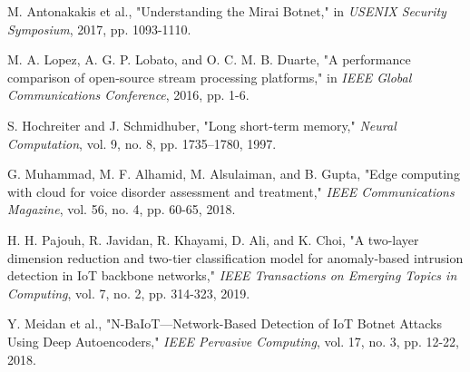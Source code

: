 \documentclass[conference]{IEEEtran}
\begin{document}
\begin{thebibliography}{00}
 M. Antonakakis et al., "Understanding the Mirai Botnet," in \textit{USENIX Security Symposium}, 2017, pp. 1093-1110.

 M. A. Lopez, A. G. P. Lobato, and O. C. M. B. Duarte, "A performance comparison of open-source stream processing platforms," in \textit{IEEE Global Communications Conference}, 2016, pp. 1-6.

 S. Hochreiter and J. Schmidhuber, "Long short-term memory," \textit{Neural Computation}, vol. 9, no. 8, pp. 1735–1780, 1997.

 G. Muhammad, M. F. Alhamid, M. Alsulaiman, and B. Gupta, "Edge computing with cloud for voice disorder assessment and treatment," \textit{IEEE Communications Magazine}, vol. 56, no. 4, pp. 60-65, 2018.

 H. H. Pajouh, R. Javidan, R. Khayami, D. Ali, and K. Choi, "A two-layer dimension reduction and two-tier classification model for anomaly-based intrusion detection in IoT backbone networks," \textit{IEEE Transactions on Emerging Topics in Computing}, vol. 7, no. 2, pp. 314-323, 2019.

 Y. Meidan et al., "N-BaIoT—Network-Based Detection of IoT Botnet Attacks Using Deep Autoencoders," \textit{IEEE Pervasive Computing}, vol. 17, no. 3, pp. 12-22, 2018.

\end{thebibliography}
\end{document}
